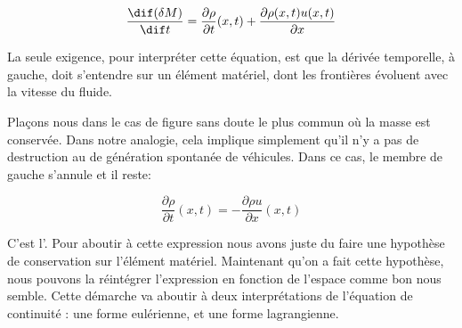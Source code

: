 \begin{equation}
  \frac{\dif (\delta M)}{\dif t}
=
\frac{\partial \rho}{\partial t}(x,t)
+ \frac{\partial \rho(x,t) u(x,t)}{\partial x}
\label{eq:cons_massineique_diff}
\end{equation}

La seule exigence, pour interpréter cette équation, est que la dérivée temporelle, à gauche, doit s'entendre sur un élément matériel, dont les frontières évoluent avec la vitesse du fluide. 

Plaçons nous dans le cas de figure sans doute le plus commun où la masse est conservée. Dans notre analogie, cela implique simplement qu'il n'y a pas de destruction au de génération spontanée de véhicules. Dans ce cas, le membre de gauche s'annule et  il reste: 

\begin{equation}
\frac{\partial \rho}{\partial t}(x,t)
= - \frac{\partial \rho u}{\partial x}(x,t)
\label{eq:cons_continuite_lineique}
\end{equation}

C'est l'. Pour aboutir à cette expression nous avons juste du faire une hypothèse de conservation sur l'élément matériel. Maintenant qu'on a fait cette hypothèse, nous pouvons la réintégrer l'expression en fonction de l'espace comme bon nous semble. Cette démarche va aboutir à deux interprétations de l'équation de continuité : une forme eulérienne, et une forme lagrangienne. 

